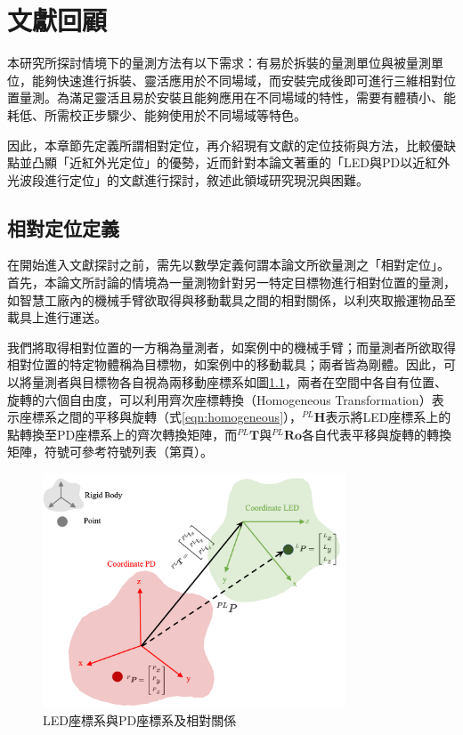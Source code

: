\chapter{文獻回顧}







本研究所探討情境下的量測方法有以下需求：有易於拆裝的量測單位與被量測單位，能夠快速進行拆裝、靈活應用於不同場域，而安裝完成後即可進行三維相對位置量測。為滿足靈活且易於安裝且能夠應用在不同場域的特性，需要有體積小、能耗低、所需校正步驟少、能夠使用於不同場域等特色。

因此，本章節先定義所謂相對定位，再介紹現有文獻的定位技術與方法，比較優缺點並凸顯「近紅外光定位」的優勢，近而針對本論文著重的「LED與PD以近紅外光波段進行定位」的文獻進行探討，敘述此領域研究現況與困難。       








\section{相對定位定義}
\label{chp:relative}
    
    在開始進入文獻探討之前，需先以數學定義何謂本論文所欲量測之「相對定位」。首先，本論文所討論的情境為一量測物針對另一特定目標物進行相對位置的量測，如智慧工廠內的機械手臂欲取得與移動載具之間的相對關係，以利夾取搬運物品至載具上進行運送。
    
    我們將取得相對位置的一方稱為量測者，如案例中的機械手臂；而量測者所欲取得相對位置的特定物體稱為目標物，如案例中的移動載具；兩者皆為剛體。因此，可以將量測者與目標物各自視為兩移動座標系如圖\ref{pic:homo_trans}，兩者在空間中各自有位置、旋轉的六個自由度，可以利用齊次座標轉換（Homogeneous Transformation）表示座標系之間的平移與旋轉（式\ref{eqn:homogeneous}），$^{PL}\boldsymbol{H}$表示將LED座標系上的點轉換至PD座標系上的齊次轉換矩陣，而$^{PL}\boldsymbol{T}$與$^{PL}\boldsymbol{Ro}$各自代表平移與旋轉的轉換矩陣，符號可參考符號列表（第\pageref{chp:symbol}頁）。
    
    \begin{figure}[ht]
        \centering
        \includegraphics[width=9cm]{ch2pic/homo_trans.png}
        \caption{LED座標系與PD座標系及相對關係}
        \label{pic:homo_trans}
    \end{figure}

